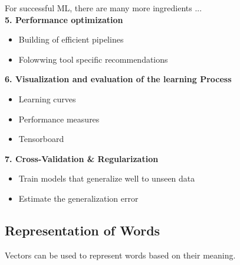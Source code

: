 For successful ML, there are many more ingredients ...\\
\textbf{5. Performance optimization}
\begin{itemize}
    \item Building of efficient pipelines
    \item Folowwing tool specific recommendations
\end{itemize}
\textbf{6. Visualization and evaluation of the learning Process}
\begin{itemize}
    \item Learning curves
    \item Performance measures
    \item Tensorboard
\end{itemize}
\textbf{7. Cross-Validation \& Regularization}
\begin{itemize}
    \item Train models that generalize well to unseen data
    \item Estimate the generalization error
\end{itemize}

\subsection{Representation of Words}
Vectors can be used to represent words based on their meaning.
